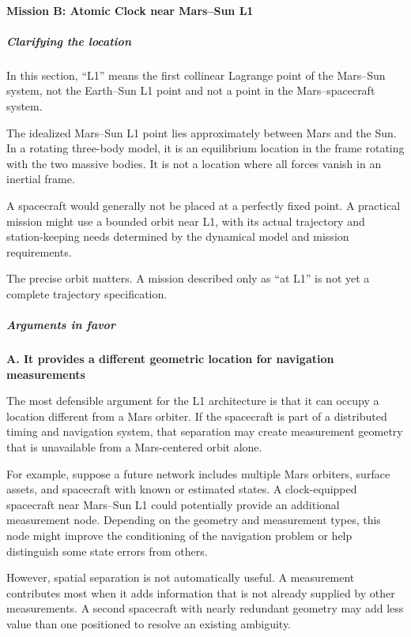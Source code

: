 \paragraph{Mission B: Atomic Clock near Mars--Sun L1}

\subparagraph{Clarifying the location}

In this section, ``L1'' means the first collinear Lagrange point
of the Mars--Sun system, not the Earth--Sun L1 point and not
a point in the Mars--spacecraft system.

The idealized Mars--Sun L1 point lies approximately between Mars
and the Sun. In a rotating three-body model, it is an equilibrium
location in the frame rotating with the two massive bodies.
It is not a location where all forces vanish in an inertial frame.

A spacecraft would generally not be placed at a perfectly fixed
point. A practical mission might use a bounded orbit near L1,
with its actual trajectory and station-keeping needs determined
by the dynamical model and mission requirements.

The precise orbit matters. A mission described only as
``at L1'' is not yet a complete trajectory specification.

\subparagraph{Arguments in favor}

\textbf{A. It provides a different geometric location for
	navigation measurements}

The most defensible argument for the L1 architecture is that
it can occupy a location different from a Mars orbiter. If the
spacecraft is part of a distributed timing and navigation system,
that separation may create measurement geometry that is unavailable
from a Mars-centered orbit alone.

For example, suppose a future network includes multiple Mars
orbiters, surface assets, and spacecraft with known or estimated
states. A clock-equipped spacecraft near Mars--Sun L1 could
potentially provide an additional measurement node. Depending
on the geometry and measurement types, this node might improve
the conditioning of the navigation problem or help distinguish
some state errors from others.

However, spatial separation is not automatically useful. A
measurement contributes most when it adds information that is
not already supplied by other measurements. A second spacecraft
with nearly redundant geometry may add less value than one
positioned to resolve an existing ambiguity.

